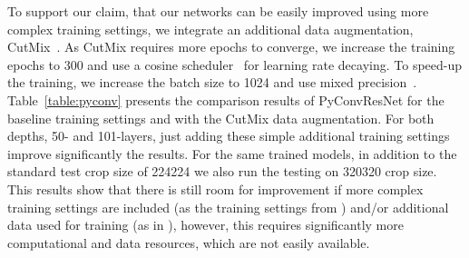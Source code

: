 \documentclass{article}
\begin{document}
To support our claim, that our networks can be easily improved using more complex training settings, we integrate an additional data augmentation, CutMix~\cite{yun2019cutmix}. As CutMix requires more epochs to converge,  we increase the training epochs to 300 and use a cosine scheduler~\cite{loshchilov2016sgdr} for learning rate decaying. To speed-up the training, we increase the batch size to 1024 and use mixed precision~\cite{micikevicius2017mixed}. Table~\ref{table:pyconv} presents the comparison results of PyConvResNet for the baseline training settings and with the CutMix data augmentation. For both depths, 50- and 101-layers, just adding these simple additional training settings improve significantly the results. For the same trained models, in addition to the standard test crop size of 224224 we also run  the testing on 320320 crop size. This results show that there is still room for improvement if more complex training settings are included (as the training settings from \cite{tan2019efficientnet}) and/or additional data used for training (as in \cite{mahajan2018exploring,touvron2019fixing}), however, this requires significantly more computational and data resources, which are not easily available.






\addtolength{\tabcolsep}{+0.5pt}
\begin{table*}[t]
\centering
\caption{Head-to-Head comparison on image segmentation (ResNet-50 as backbone) on {\small ADE20K}.}
\vspace{-0.1in}
\label{table:head-to-head}
\vspace{-0.2in}
\end{table*}
\addtolength{\tabcolsep}{-0.5pt}
\end{document}
